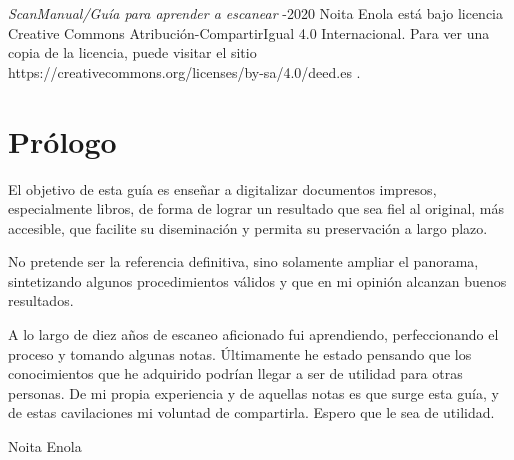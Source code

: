 \documentclass[%
	a5paper,
	10pt,
	twoside,
	openright,
	final,
]{memoir}
\begin{document}
%

	\newpage\null\thispagestyle{empty}\newpage
	\newpage\null\thispagestyle{empty}\newpage

\frontmatter
	\thispagestyle{empty}%
	\halftitleTH%
	\cleardoublepage%
	\thispagestyle{empty}%
	\titleTH%
	\clearpage%

	\thispagestyle{empty}%
	{\emph{ScanManual/Guía para aprender a escanear} -2020 Noita Enola está bajo licencia Creative Commons Atribución-CompartirIgual 4.0 Internacional. Para ver una copia de la licencia, puede visitar el sitio https://creativecommons.org/licenses/by-sa/4.0/deed.es \cite{CC-BY-SA-4.0}.

	\vfill
	\license

	\chapter{Prólogo} El objetivo de esta guía es enseñar a digitalizar documentos impresos, especialmente libros, de forma de lograr un resultado que sea fiel al original, más accesible, que facilite su diseminación y permita su preservación a largo plazo.

	No pretende ser la referencia definitiva, sino solamente ampliar el panorama, sintetizando algunos procedimientos válidos y que en mi opinión alcanzan buenos resultados.

	A lo largo de diez años de escaneo aficionado fui aprendiendo, perfeccionando el proceso y tomando algunas notas. Últimamente he estado pensando que los conocimientos que he adquirido podrían llegar a ser de utilidad para otras personas. De mi propia experiencia y de aquellas notas es que surge esta guía, y de estas cavilaciones mi voluntad de compartirla. Espero que le sea de utilidad.

	{\raggedleft Noita Enola\par}\cleardoublepage

	\tableofcontents

\mainmatter

}
\end{document}
